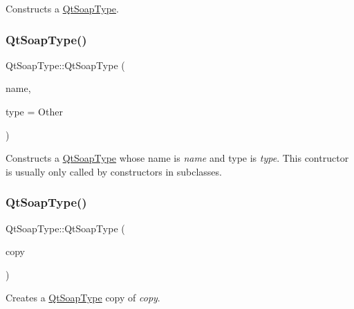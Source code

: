 Constructs a \mbox{\hyperlink{class_qt_soap_type}{Qt\+Soap\+Type}}. \mbox{\label{class_qt_soap_type_a70eb2a6c11ab1d10bf2aaa5b78450db2}} 
\subsubsection{\texorpdfstring{Qt\+Soap\+Type()}{QtSoapType()}\hspace{0.1cm}{\footnotesize\ttfamily [2/3]}}
{\footnotesize\ttfamily Qt\+Soap\+Type\+::\+Qt\+Soap\+Type (\begin{DoxyParamCaption}\item[{const \mbox{\hyperlink{class_qt_soap_q_name}{Qt\+Soap\+Q\+Name}} \&}]{name,  }\item[{\mbox{\hyperlink{class_qt_soap_type_a840b69f1d92eeb4e64ae1e0439d54683}{Type}}}]{type = {\ttfamily Other} }\end{DoxyParamCaption})}

Constructs a \mbox{\hyperlink{class_qt_soap_type}{Qt\+Soap\+Type}} whose name is {\itshape name} and type is {\itshape type}. This contructor is usually only called by constructors in subclasses. \mbox{\label{class_qt_soap_type_afedef32defaffd10424deb2c38fde2e2}} 
\subsubsection{\texorpdfstring{Qt\+Soap\+Type()}{QtSoapType()}\hspace{0.1cm}{\footnotesize\ttfamily [3/3]}}
{\footnotesize\ttfamily Qt\+Soap\+Type\+::\+Qt\+Soap\+Type (\begin{DoxyParamCaption}\item[{const \mbox{\hyperlink{class_qt_soap_type}{Qt\+Soap\+Type}} \&}]{copy }\end{DoxyParamCaption})}

Creates a \mbox{\hyperlink{class_qt_soap_type}{Qt\+Soap\+Type}} copy of {\itshape copy}. \mbox{\label{class_qt_soap_type_aeb5690cc94b2ce5ff2ea6fa862ddb838}} 

